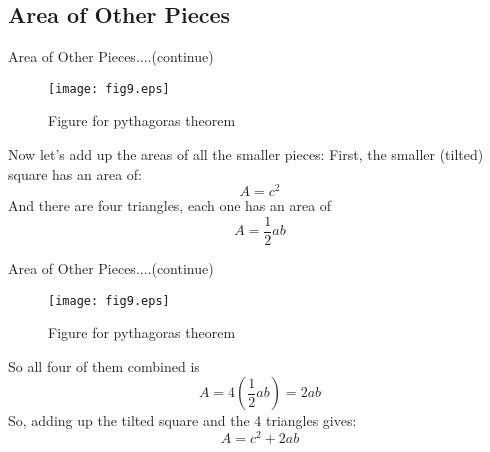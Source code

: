 \documentclass[10pt]{beamer}
\begin{document}
\subsection{Area of Other Pieces}
\label{a_pieces}
\begin{frame}{Area of Other Pieces....(continue)}
\begin{figure}[htb!]
  \begin{center}
    \texttt{[image: fig9.eps]}
   \end{center}
  \caption{Figure for pythagoras theorem}
  \label{image1}
\end{figure}
\transfade

Now let's add up the areas of all the smaller pieces:\newline
First, the smaller (tilted) square has an area of:
\begin{equation}
\label{two}
A = c^2 
\end{equation} 
And there are four triangles, each one has an area of 
\begin{equation}
\label{three}
A =\frac{1}{2} ab
\end{equation}
\end{frame}

\begin{frame}{Area of Other Pieces....(continue)}
\begin{figure}[htb!]
  \begin{center}
    \texttt{[image: fig9.eps]}
   \end{center}
  \caption{Figure for pythagoras theorem}
  \label{image1}
\end{figure}

\transfade
So all four of them combined is	
\begin{equation}
\label{two}
A = 4(\frac{1}{2}ab) = 2ab
\end{equation} 
So, adding up the tilted square and the 4 triangles gives: 
\begin{equation}
\label{five}
A = c^2 +2ab
\end{equation}
\end{frame}
\end{document}
